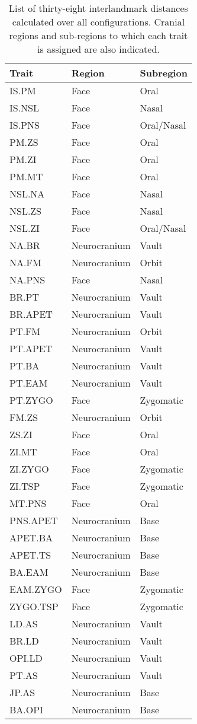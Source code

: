 \begin {table}[hp]
  \centering
  \caption {List of thirty-eight interlandmark distances calculated over all configurations. Cranial regions and sub-regions to which each trait is assigned are also indicated.}
  \label {tab:dist}
  \hr
  \begin {tabularx} {\textwidth} {X X X}
    \bf{Trait} & \bf{Region} & \bf{Subregion}  \\
    \hline
    IS.PM & Face & Oral \\
    IS.NSL & Face & Nasal \\
    IS.PNS & Face & Oral/Nasal \\
    PM.ZS & Face & Oral \\
    PM.ZI & Face & Oral \\
    PM.MT & Face & Oral \\
    NSL.NA & Face & Nasal \\
    NSL.ZS & Face & Nasal \\
    NSL.ZI & Face & Oral/Nasal \\
    NA.BR & Neurocranium & Vault \\
    NA.FM & Neurocranium & Orbit \\
    NA.PNS & Face & Nasal \\
    BR.PT & Neurocranium & Vault \\
    BR.APET & Neurocranium & Vault \\
    PT.FM & Neurocranium & Orbit \\
    PT.APET & Neurocranium & Vault \\
    PT.BA & Neurocranium & Vault \\
    PT.EAM & Neurocranium & Vault \\
    PT.ZYGO & Face & Zygomatic \\
    FM.ZS & Neurocranium & Orbit \\
    ZS.ZI & Face & Oral \\
    ZI.MT & Face & Oral \\
    ZI.ZYGO & Face & Zygomatic \\
    ZI.TSP & Face & Zygomatic \\
    MT.PNS & Face & Oral \\
    PNS.APET & Neurocranium & Base \\
    APET.BA & Neurocranium & Base \\
    APET.TS & Neurocranium & Base \\
    BA.EAM & Neurocranium & Base \\
    EAM.ZYGO & Face & Zygomatic \\
    ZYGO.TSP & Face & Zygomatic \\
    LD.AS & Neurocranium & Vault \\
    BR.LD & Neurocranium & Vault \\
    OPI.LD & Neurocranium & Vault \\
    PT.AS & Neurocranium & Vault \\
    JP.AS & Neurocranium & Base \\
    BA.OPI & Neurocranium & Base \\
  \end {tabularx}
  \hr
\end {table} %